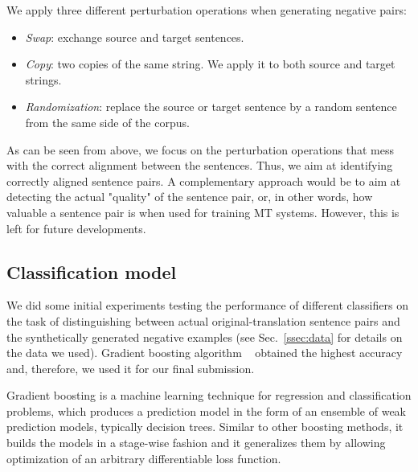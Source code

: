 We apply three different perturbation operations when generating negative pairs:
\begin{itemize}
\item \textit{Swap}: exchange source and target sentences.
\item \textit{Copy}: two copies of the same string. We apply it to both source and target strings.
\item \textit{Randomization}: replace the source or target sentence by a random sentence from the same side of the corpus.
\end{itemize}

As can be seen from above, we focus on the perturbation operations that mess with the correct alignment between the sentences. Thus, we aim at identifying correctly aligned sentence pairs. A complementary approach would be to aim at detecting the actual "quality" of the sentence pair, or, in other words, how valuable a sentence pair is when used for training MT systems. However, this is left for future developments.


\subsection{Classification model}
\label{ssec:model}

We did some initial experiments testing the performance of different classifiers on the task of distinguishing between actual original-translation sentence pairs and the synthetically generated negative examples (see Sec.~\ref{ssec:data} for details on the data we used). Gradient boosting algorithm ~\cite{Friedman02} obtained the highest accuracy and, therefore, we used it for our final submission.

Gradient boosting is a machine learning technique for regression and classification problems, which produces a prediction model in the form of an ensemble of weak prediction models, typically decision trees. Similar to other boosting methods, it builds the models in a stage-wise fashion and it generalizes them by allowing optimization of an arbitrary differentiable loss function.
